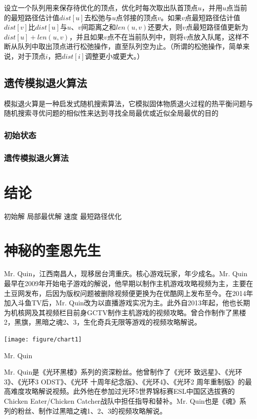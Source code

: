 \documentclass[a4paper,11pt,onecolumn,twoside]{article}
\makeatletter
\newenvironment{figurehere}
  {\def\@captype{figure}}
  {}
\makeatother
\begin{document}
\begin{multicols}{2}
设立一个队列用来保存待优化的顶点，优化时每次取出队首顶点$u$，并用$u$点当前的最短路径估计值$dist[u]$去松弛与$u$点邻接的顶点$v$。如果$v$点最短路径估计值$dist[v]$比$dist[u]$与$u$、$v$间距离之和$len(u,v)$还要大，则$v$点最短路径值更新为$dist[u]+len(u,v)$，并且如果$v$点不在当前队列中，则将$v$点放入队尾，这样不断从队列中取出顶点进行松弛操作，直至队列空为止。（所谓的松弛操作，简单来说，对于顶点$i$，把$dist[i]$调整更小或更大。）

\subsection{遗传模拟退火算法}
模拟退火算是一种启发式随机搜索算法，它模拟固体物质退火过程的热平衡问题与随机搜索寻优问题的相似性来达到寻找全局最优或近似全局最优的目的
\subsubsection{初始状态}

\subsubsection{遗传模拟退火算法}

\section{结论}
初始解
局部最优解
速度
最短路径优化
\section{神秘的奎恩先生}

Mr. Quin，江西南昌人，现移居台湾重庆。核心游戏玩家，年少成名。Mr. Quin最早在2009年开始电子游戏的解说，他早期以制作主机游戏攻略视频为主，主要在土豆网发布，后因为版权问题被删除视频便更换为在优酷网上发布至今。在2014年加入斗鱼TV后，Mr. Quin改为以直播游戏实况为主。此外自2013年起，他也长期为机核网及其视频栏目前身GCTV制作主机游戏的视频攻略。曾合作制作了黑楼2，黑旗，黑暗之魂2、3，生化奇兵无限等游戏的视频攻略解说。

\begin{figurehere}
	\centering
	\texttt{[image: figure/chart1]}
	\caption{Mr. Quin}
	\label{chart1}
\end{figurehere}

Mr. Quin是《光环黑楼》系列的资深粉丝。他曾制作了《光环 致远星》、《光环3》、《光环3 ODST》、《光环 十周年纪念版》、《光环4》、《光环2 周年重制版》的最高难度攻略解说视频。此外他在参加过光环5世界锦标赛ESL中国区选拔赛的Chicken Eater/Chicken Catcher战队中担任指导和替补。Mr. Quin也是《魂》系列的粉丝、制作过黑暗之魂1、2、3的视频攻略解说。


\end{multicols}
\end{document}
